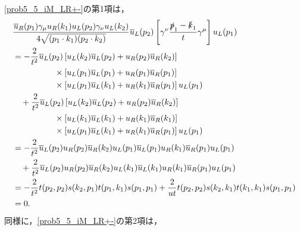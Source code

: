 \eqref{prob5_5_iM_LR+-}の第1項は，
\begin{align}
  \begin{split}
    & \frac{\overline{u}_R(p_1)\gamma_\mu u_R(k_1) u_L(p_2)\gamma_\nu u_L(k_2)}{4\sqrt{(p_1 \cdot k_1)(p_2 \cdot k_2)}} \overline{u}_L(p_2)
    \left[ \gamma^\nu \frac{\slashed{p}_1 - \slashed{k}_1}{t} \gamma^\mu \right] u_L(p_1) \\
    &= -\frac{2}{t^2} \overline{u}_L(p_2) \left[ u_L(k_2)\overline{u}_L(p_2) + u_R(p_2)\overline{u}_R(k_2) \right] \\
    &\qquad\qquad\quad\times \left[ u_L(p_1)\overline{u}_L(p_1) + u_R(p_1)\overline{u}_R(p_1) \right] \\
    &\qquad\qquad\quad\times \left[ u_L(p_1)\overline{u}_L(k_1) + u_R(k_1)\overline{u}_R(p_1) \right] u_L(p_1) \\
    &\quad +\frac{2}{t^2} \overline{u}_L(p_2) \left[ u_L(k_2)\overline{u}_L(p_2) + u_R(p_2)\overline{u}_R(k_2) \right] \\
    &\qquad\qquad\quad\times \left[ u_L(k_1)\overline{u}_L(k_1) + u_R(k_1)\overline{u}_R(k_1) \right] \\
    &\qquad\qquad\quad\times \left[ u_L(p_1)\overline{u}_L(k_1) + u_R(k_1)\overline{u}_R(p_1) \right] u_L(p_1) \\
    &= -\frac{2}{t^2} \overline{u}_L(p_2) u_R(p_2)\overline{u}_R(k_2) u_L(p_1)\overline{u}_L(p_1) u_R(k_1)\overline{u}_R(p_1) u_L(p_1) \\
    &\quad +\frac{2}{t^2} \overline{u}_L(p_2) u_R(p_2)\overline{u}_R(k_2) u_L(k_1)\overline{u}_L(k_1) u_R(k_1)\overline{u}_R(p_1) u_L(p_1) \\
    &= -\frac{2}{t^2} t(p_2, p_2) s(k_2, p_1) t(p_1, k_1) s(p_1, p_1) + \frac{2}{ut} t(p_2, p_2) s(k_2, k_1) t(k_1, k_1) s(p_1, p_1) \\
    &= 0 .
  \end{split}
  \label{prob5_5_iM_LR+-_term1}
\end{align}
同様に，\eqref{prob5_5_iM_LR+-}の第2項は，
